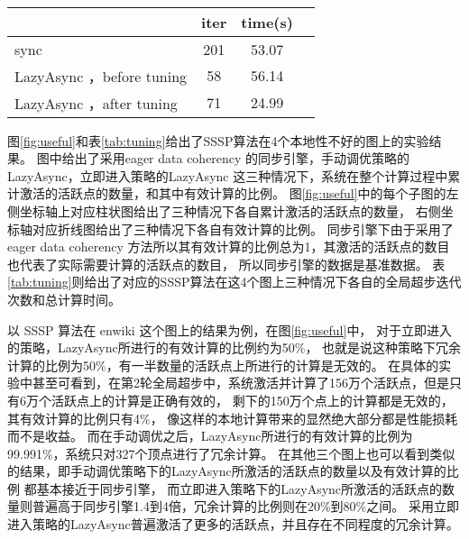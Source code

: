 \begin{table}[!htbp]
\begin{subtable}[t]{0.45\textwidth}
\begin{tabular}{lccc}
          \hline
      \end{tabular}
  \end{subtable}
  ~%
  \begin{subtable}[t]{0.45\textwidth}
      \centering
      \label{tab:sample_4}
      \begin{tabular}{lccc}
          \hline
          & iter  & time(s) \\
          \hline
          sync & 201 & 53.07 \\
          \hline
          LazyAsync ，before tuning & 58 & {\color{red}56.14} \\
          \hline
          LazyAsync ，after tuning & 71 & 24.99 \\
          \hline
      \end{tabular}
  \end{subtable}
\end{table}
图\ref{fig:useful}和表\ref{tab:tuning}给出了SSSP算法在4个本地性不好的图上的实验结果。
图中给出了采用eager data coherency 的同步引擎，手动调优策略的LazyAsync，立即进入策略的LazyAsync
这三种情况下，系统在整个计算过程中累计激活的活跃点的数量，和其中有效计算的比例。
图\ref{fig:useful}中的每个子图的左侧坐标轴上对应柱状图给出了三种情况下各自累计激活的活跃点的数量，
右侧坐标轴对应折线图给出了三种情况下各自有效计算的比例。
同步引擎下由于采用了eager data coherency 方法所以其有效计算的比例总为1，其激活的活跃点的数目也代表了实际需要计算的活跃点的数目，
所以同步引擎的数据是基准数据。
表\ref{tab:tuning}则给出了对应的SSSP算法在这4个图上三种情况下各自的全局超步迭代次数和总计算时间。

以 SSSP 算法在 enwiki 这个图上的结果为例，在图\ref{fig:useful}中，
对于立即进入的策略，LazyAsync所进行的有效计算的比例约为50\%，
也就是说这种策略下冗余计算的比例为50\%，有一半数量的活跃点上所进行的计算是无效的。
在具体的实验中甚至可看到，在第2轮全局超步中，系统激活并计算了156万个活跃点，但是只有6万个活跃点上的计算是正确有效的，
剩下的150万个点上的计算都是无效的，其有效计算的比例只有4\%，
像这样的本地计算带来的显然绝大部分都是性能损耗而不是收益。
而在手动调优之后，LazyAsync所进行的有效计算的比例为99.991\%，系统只对327个顶点进行了冗余计算。
在其他三个图上也可以看到类似的结果，即手动调优策略下的LazyAsync所激活的活跃点的数量以及有效计算的比例
都基本接近于同步引擎，
而立即进入策略下的LazyAsync所激活的活跃点的数量则普遍高于同步引擎1.4到4倍，冗余计算的比例则在20\%到80\%之间。
采用立即进入策略的LazyAsync普遍激活了更多的活跃点，并且存在不同程度的冗余计算。

